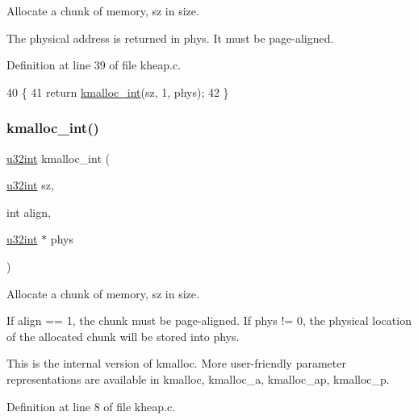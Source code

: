 Allocate a chunk of memory, sz in size. 

The physical address is returned in phys. It must be page-\/aligned. 

Definition at line 39 of file kheap.\+c.


\begin{DoxyCode}
40 \{
41     \textcolor{keywordflow}{return} \hyperlink{a00071_a8b976e8a7e805ef85fcfa68b9b9bbd63_a8b976e8a7e805ef85fcfa68b9b9bbd63}{kmalloc\_int}(sz, 1, phys);
42 \}
\end{DoxyCode}
\mbox{\label{a00074_a8b976e8a7e805ef85fcfa68b9b9bbd63_a8b976e8a7e805ef85fcfa68b9b9bbd63}} 
\subsubsection{\texorpdfstring{kmalloc\+\_\+int()}{kmalloc\_int()}}
{\footnotesize\ttfamily \hyperlink{a00125_a7ae3a26c17ddfe117c6291739780801d_a7ae3a26c17ddfe117c6291739780801d}{u32int} kmalloc\+\_\+int (\begin{DoxyParamCaption}\item[{\hyperlink{a00125_a7ae3a26c17ddfe117c6291739780801d_a7ae3a26c17ddfe117c6291739780801d}{u32int}}]{sz,  }\item[{int}]{align,  }\item[{\hyperlink{a00125_a7ae3a26c17ddfe117c6291739780801d_a7ae3a26c17ddfe117c6291739780801d}{u32int} $\ast$}]{phys }\end{DoxyParamCaption})}



Allocate a chunk of memory, sz in size. 

If align == 1, the chunk must be page-\/aligned. If phys != 0, the physical location of the allocated chunk will be stored into phys.

This is the internal version of kmalloc. More user-\/friendly parameter representations are available in kmalloc, kmalloc\+\_\+a, kmalloc\+\_\+ap, kmalloc\+\_\+p. 

Definition at line 8 of file kheap.\+c.


